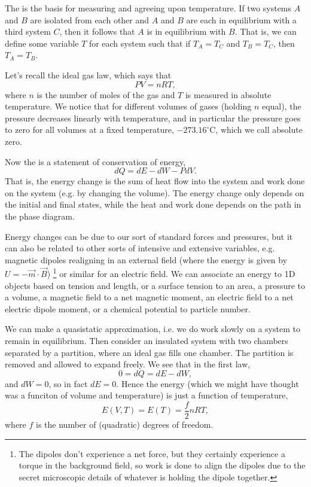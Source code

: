 The  is the basis for measuring and agreeing upon temperature. If two systems $A$ and $B$ are isolated from each other and $A$ and $B$ are each in equilibrium with a third system $C$, then it follows that $A$ is in equilibrium with $B$. That is, we can define some variable $T$ for each system such that if $T_A=T_C$ and $T_B=T_C$, then $T_A=T_B$.

Let's recall the ideal gas law, which says that
\begin{equation}
    PV= nRT,
\end{equation}
where $n$ is the number of moles of the gas and $T$ is measured in absolute temperature. We notice that for different volumes of gases (holding $n$ equal), the pressure decreases linearly with temperature, and in particular the pressure goes to zero for all volumes at a fixed temperature, $-273.16^\circ$C, which we call absolute zero.

Now the  is a statement of conservation of energy,
\begin{equation}
    dQ = dE - dW - PdV.
\end{equation}
That is, the energy change is the sum of heat flow into the system and work done on the system (e.g. by changing the volume). The energy change only depends on the initial and final states, while the heat and work done depends on the path in the phase diagram.

Energy changes can be due to our sort of standard forces and pressures, but it can also be related to other sorts of intensive and extensive variables, e.g. magnetic dipoles realigning in an external field (where the energy is given by $U=-\vec m \cdot \vec B$)%
    \footnote{The dipoles don't experience a net force, but they certainly experience a torque in the background field, so work is done to align the dipoles due to the secret microscopic details of whatever is holding the dipole together.}
or similar for an electric field. We can associate an energy to 1D objects based on tension and length, or a surface tension to an area, a pressure to a volume, a magnetic field to a net magnetic moment, an electric field to a net electric dipole moment, or a chemical potential to particle number.

We can make a quasistatic approximation, i.e. we do work slowly on a system to remain in equilibrium. Then consider an insulated system with two chambers separated by a partition, where an ideal gas fills one chamber. The partition is removed and allowed to expand freely. We see that in the first law,
\begin{equation}
    0=dQ = dE-dW,
\end{equation}
and $dW=0$, so in fact $dE=0$. Hence the energy (which we might have thought was a funciton of volume and temperature) is just a function of temperature,
\begin{equation}
    E(V,T) = E(T) = \frac{f}{2} n RT,
\end{equation}
where $f$ is the number of (quadratic) degrees of freedom.

